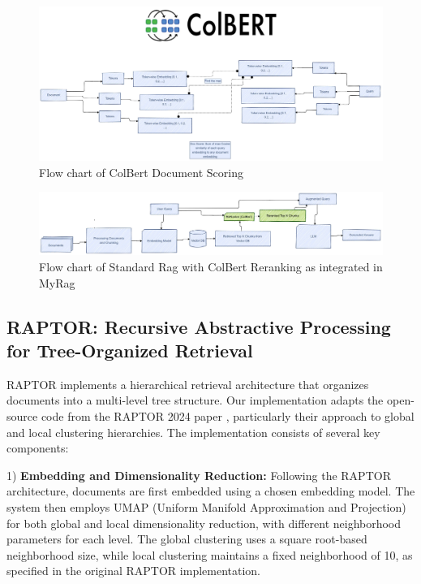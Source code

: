 \documentclass{scrartcl}
\begin{document}
\begin{figure}[H]
	\centering
	\includegraphics[width=\linewidth]{Colbert.pdf}
	\caption{Flow chart of ColBert Document Scoring}
	\label{fig:colbert}
\end{figure}


\begin{figure}[H]
	\centering
	\includegraphics[width=\linewidth]{StandardRagWithReRanking.pdf}
	\caption{Flow chart of Standard Rag with ColBert Reranking as integrated in MyRag}
	\label{fig:reranking_rag}
\end{figure}


\subsection{RAPTOR: Recursive Abstractive Processing for Tree-Organized Retrieval}
RAPTOR \cite{wu2021recursively, raptor2024} implements a hierarchical retrieval architecture that organizes documents into a multi-level tree structure. Our implementation adapts the open-source code from the RAPTOR 2024 paper \cite{raptor2024}, particularly their approach to global and local clustering hierarchies. The implementation consists of several key components:

1) \textbf{Embedding and Dimensionality Reduction:} Following the RAPTOR architecture, documents are first embedded using a chosen embedding model. The system then employs UMAP (Uniform Manifold Approximation and Projection) for both global and local dimensionality reduction, with different neighborhood parameters for each level. The global clustering uses a square root-based neighborhood size, while local clustering maintains a fixed neighborhood of 10, as specified in the original RAPTOR implementation.
\end{document}

